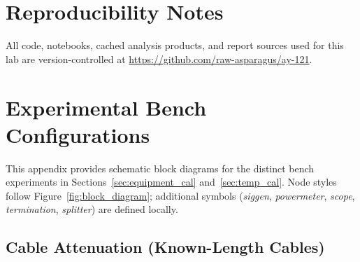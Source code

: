 \documentclass[10pt,preprint2]{aastex}
\begin{document}
\section{Reproducibility Notes}
\label{sec:app_reproducibility}

All code, notebooks, cached analysis products, and report sources used for
this lab are version-controlled at
\url{https://github.com/raw-asparagus/ay-121}. 

\section{Experimental Bench Configurations}
\label{sec:app_bench}

This appendix provides schematic block diagrams for the distinct bench
experiments in Sections~\ref{sec:equipment_cal} and~\ref{sec:temp_cal}.
Node styles follow Figure~\ref{fig:block_diagram}; additional symbols
(\textit{siggen}, \textit{powermeter}, \textit{scope}, \textit{termination},
\textit{splitter}) are defined locally.

\subsection{Cable Attenuation (Known-Length Cables)}
\end{document}
